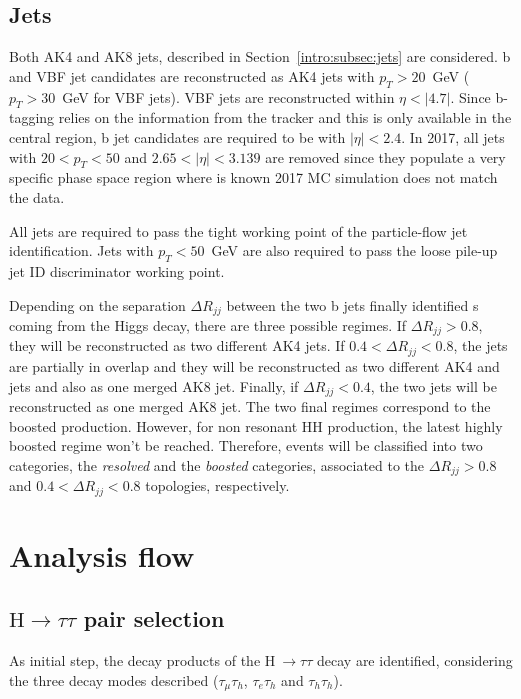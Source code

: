 \documentclass[../main.tex]{subfiles}
\begin{document}
\subsection{Jets}
\label{hh:subsec:jets}

Both AK4 and AK8 jets, described in Section~\ref{intro:subsec:jets} are considered. b and VBF jet candidates are reconstructed as AK4 jets with $p_T>20$~GeV ($p_T>30$~GeV for VBF jets). VBF jets are reconstructed within $\eta<|4.7|$. Since b-tagging relies on the information from the tracker and this is only available in the central region, b jet candidates are required to be with $|\eta|<2.4$. In 2017, all jets with $20<p_T<50$ and $2.65<|\eta|<3.139$ are removed since they populate a very specific phase space region where is known 2017 MC simulation does not match the data.

All jets are required to pass the tight working point of the particle-flow jet identification. Jets with $p_T<50$~GeV are also required to pass the loose pile-up jet ID discriminator working point.

Depending on the separation $\Delta R_{jj}$ between the two b jets finally identified s coming from the Higgs decay, there are three possible regimes. If $\Delta R_{jj} > 0.8$, they will be reconstructed as two different AK4 jets. If $0.4 < \Delta R_{jj} < 0.8$, the jets are partially in overlap and they will be reconstructed as two different AK4 and jets and also as one merged AK8 jet. Finally, if $\Delta R_{jj} < 0.4$, the two jets will be reconstructed as one merged AK8 jet. The two final regimes correspond to the boosted production. However, for non resonant HH production, the latest highly boosted regime won't be reached. Therefore, events will be classified into two categories, the \textit{resolved} and the \textit{boosted} categories, associated to the $\Delta R_{jj} > 0.8$ and $0.4 < \Delta R_{jj} < 0.8$ topologies, respectively.



\section{Analysis flow}
\label{hh:sec:analysis_flow}

\subsection{$\text{H}\to\tau\tau$ pair selection}
\label{hh:subsec:htt_pair_selection}

As initial step, the decay products of the H$~\to\tau\tau$ decay are identified, considering the three decay modes described ($\tau_\mu\tau_h$, $\tau_e\tau_h$ and $\tau_h\tau_h$). 
\end{document}
